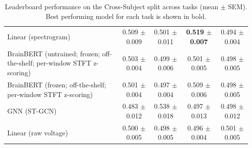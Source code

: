 \begin{table}[!htbp]
\begin{tabular}{>{\raggedright\arraybackslash}p{8cm}cccc}
Linear (spectrogram) & 0.509 $\pm$ 0.009 & 0.501 $\pm$ 0.011 & \textbf{0.519 $\pm$ 0.007} & 0.494 $\pm$ 0.004 \\
BrainBERT (untrained; frozen; off-the-shelf; per-window STFT z-scoring) & 0.503 $\pm$ 0.004 & 0.499 $\pm$ 0.006 & 0.501 $\pm$ 0.005 & 0.498 $\pm$ 0.005 \\
BrainBERT (frozen; off-the-shelf; per-window STFT z-scoring) & 0.501 $\pm$ 0.004 & 0.497 $\pm$ 0.004 & 0.509 $\pm$ 0.006 & 0.498 $\pm$ 0.005 \\
GNN (ST-GCN) & 0.483 $\pm$ 0.012 & 0.538 $\pm$ 0.018 & 0.497 $\pm$ 0.013 & 0.498 $\pm$ 0.012 \\
Linear (raw voltage) & 0.500 $\pm$ 0.005 & 0.498 $\pm$ 0.005 & 0.496 $\pm$ 0.004 & 0.501 $\pm$ 0.005 \\
\hline
\end{tabular}
\caption{Leaderboard performance on the Cross-Subject split across tasks (mean $\pm$ SEM). Best performing model for each task is shown in bold.}
\label{tab:leaderboard_performance_CrossSubject}
\end{table}